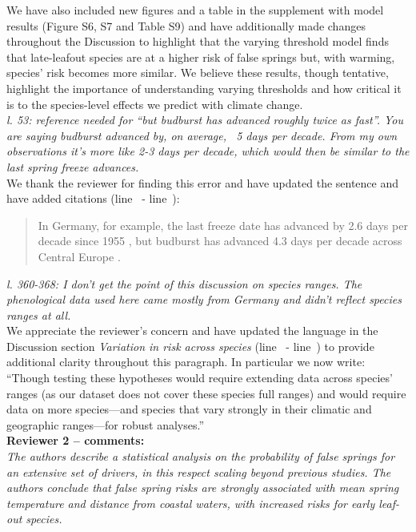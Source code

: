 \documentclass[11pt,a4paper]{article}\usepackage[]{graphicx}\usepackage[]{color}
\newcommand{\lr}[1]{line~\lineref{#1}}
\begin{document}
We have also included new figures and a table in the supplement with model results (Figure S6, S7 and Table S9) and have additionally made changes throughout the Discussion to highlight that the varying threshold model finds that late-leafout species are at a higher risk of false springs but, with warming, species' risk becomes more similar. We believe these results, though tentative, highlight the importance of understanding varying thresholds and how critical it is to the species-level effects we predict with climate change.\\

\textit{l. 53: reference needed for ``but budburst has advanced roughly twice as fast''. You are saying budburst advanced by, on average, ~5 days per decade. From my own observations it's more like 2-3 days per decade, which would then be similar to the last spring freeze advances.} \\

We thank the reviewer for finding this error and have updated the sentence and have added citations (\lr{Zbbrefbegin} - \lr{Zbbrefend}): \\

\begin{quotation}
\noindent  In Germany, for example, the last freeze date has advanced by 2.6 days per decade since 1955 \citep{Zohner2016}, but budburst has advanced 4.3 days per decade across Central Europe \citep{Fu2014,Vitasse2018}.
\end{quotation}


\textit{l. 360-368: I don't get the point of this discussion on species ranges. The phenological data used here came mostly from Germany and didn't reflect species ranges at all.} \\

We appreciate the reviewer's concern and have updated the language in the Discussion section \textit{Variation in risk across species} (\lr{Z1ranges} - \lr{Z1rangesend}) to provide additional clarity throughout this paragraph. In particular we now write: ``Though testing these hypotheses would require extending data across species' ranges (as our dataset does not cover these species full ranges) and would require data on more species---and species that vary strongly in their climatic and geographic ranges---for robust analyses.''\\

\textbf {Reviewer 2 -- comments:} \\


\textit{The authors describe a statistical analysis on the probability of false springs for an extensive set of drivers, in this respect scaling beyond previous studies. The authors conclude that false spring risks are strongly associated with mean spring temperature and distance from coastal waters, with increased risks for early leaf-out species.} \\
\end{document}
